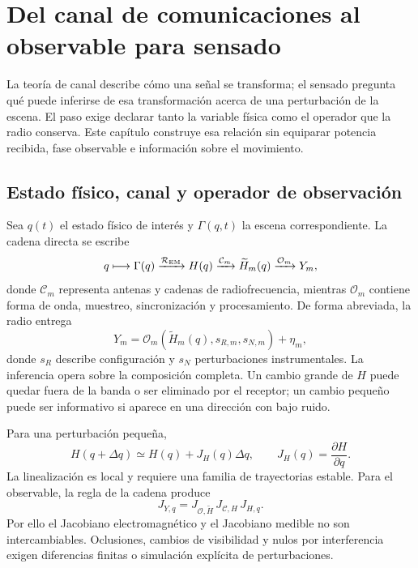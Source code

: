 \chapter{Del canal de comunicaciones al observable para sensado}
\label{ch:canal_observable}

La teoría de canal describe cómo una señal se transforma; el sensado pregunta
qué puede inferirse de esa transformación acerca de una perturbación de la escena.
El paso exige declarar tanto la variable física como el operador que la radio
conserva. Este capítulo construye esa relación sin equiparar potencia recibida,
fase observable e información sobre el movimiento.

\section{Estado físico, canal y operador de observación}

Sea $q(t)$ el estado físico de interés y $\Gamma(q,t)$ la escena correspondiente.
La cadena directa se escribe
\begin{equation}
q\longmapsto\Gamma(q)
\xrightarrow{\mathcal R_{\rm EM}}H(q)
\xrightarrow{\mathcal C_m}\widetilde H_m(q)
\xrightarrow{\mathcal O_m}Y_m,
\end{equation}
donde $\mathcal C_m$ representa antenas y cadenas de radiofrecuencia, mientras
$\mathcal O_m$ contiene forma de onda, muestreo, sincronización y procesamiento.
De forma abreviada, la radio entrega
\begin{equation}
Y_m=\mathcal O_m\!\left(\widetilde H_m(q),s_{R,m},s_{N,m}\right)+\eta_m,
\label{eq:observation_operator}
\end{equation}
donde $s_R$ describe configuración y $s_N$ perturbaciones instrumentales. La
inferencia opera sobre la composición completa. Un cambio grande de $H$ puede
quedar fuera de la banda o ser eliminado por el receptor; un cambio pequeño puede
ser informativo si aparece en una dirección con bajo ruido.

Para una perturbación pequeña,
\begin{equation}
H(q+\Delta q)\simeq H(q)+J_H(q)\Delta q,
\qquad J_H(q)=\frac{\partial H}{\partial q}.
\label{eq:local_channel_jacobian}
\end{equation}
La linealización es local y requiere una familia de trayectorias estable. Para el
observable, la regla de la cadena produce
\[
J_{Y,q}=J_{\mathcal O,\widetilde H}\,
J_{\mathcal C,H}\,J_{H,q}.
\]
Por ello el Jacobiano electromagnético y el Jacobiano medible no son
intercambiables. Oclusiones, cambios de visibilidad y nulos por interferencia
exigen diferencias finitas o simulación explícita de perturbaciones.

